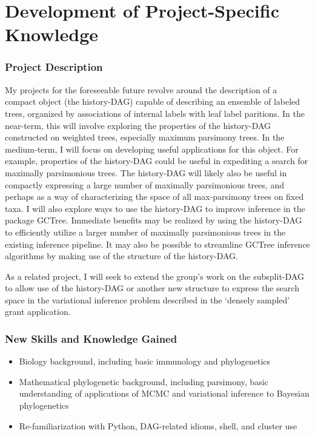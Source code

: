 \documentclass{paper}
\begin{document}
\section*{Development of Project-Specific Knowledge}
\subsubsection*{Project Description}
My projects for the foreseeable future revolve around the description of a compact object (the history-DAG) capable of describing an ensemble of labeled trees, organized by associations of internal labels with leaf label paritions.
In the near-term, this will involve exploring the properties of the history-DAG constructed on weighted trees, especially maximum parsimony trees.
In the medium-term, I will focus on developing useful applications for this object.
For example, properties of the history-DAG could be useful in expediting a search for maximally parsimonious trees.
The history-DAG will likely also be useful in compactly expressing a large number of maximally parsimonious trees, and perhaps as a way of characterizing the space of all max-parsimony trees on fixed taxa.
I will also explore ways to use the history-DAG to improve inference in the package GCTree.
Immediate benefits may be realized by using the history-DAG to efficiently utilize a larger number of maximally parsimonious trees in the existing inference pipeline.
It may also be possible to streamline GCTree inference algorithms by making use of the structure of the history-DAG.

As a related project, I will seek to extend the group's work on the subsplit-DAG to allow use of the history-DAG or another new structure to express the search space in the variational inference problem described in the  `densely sampled' grant application.

\subsubsection*{New Skills and Knowledge Gained}
\begin{itemize}
    \item Biology background, including basic immunology and phylogenetics
    \item Mathematical phylogenetic background, including parsimony, basic understanding of applications of MCMC and variational inference to Bayesian phylogenetics
    \item Re-familiarization with Python, DAG-related idioms, shell, and cluster use
\end{itemize}
\end{document}
